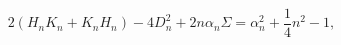 \begin{equation}
2(H_nK_n+K_nH_n)-4D_n^2+2n\alpha_n \Sigma  =
\alpha_n^2+\frac{1}{4}n^2-1,
\label{qcas}
\end{equation}


